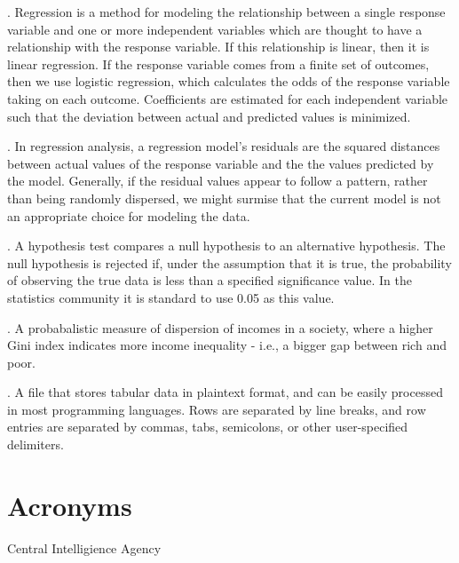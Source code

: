 \documentclass[oneside,12pt]{report}
\begin{document}
\vspace{8pt} . Regression is a method for modeling the relationship between a single response variable and one or more independent variables which are thought to have a relationship with the response variable. If this relationship is linear, then it is linear regression. If the response variable comes from a finite set of outcomes, then we use logistic regression, which calculates the odds of the response variable taking on each outcome. Coefficients are estimated for each independent variable such that the deviation between actual and predicted values is minimized.

\vspace{8pt} . In regression analysis, a regression model's residuals are the squared distances between actual values of the response variable and the the values predicted by the model. Generally, if the residual values appear to follow a pattern, rather than being randomly dispersed, we might surmise that the current model is not an appropriate choice for modeling the data.

\vspace{8pt} . A hypothesis test compares a null hypothesis to an alternative hypothesis. The null hypothesis is rejected if, under the assumption that it is true, the probability of observing the true data is less than a specified significance value. In the statistics community it is standard to use 0.05 as this value.

\vspace{8pt} . A probabalistic measure of dispersion of incomes in a society, where a higher Gini index indicates more income inequality - i.e., a bigger gap between rich and poor.

\vspace{8pt} . A file that stores tabular data in plaintext format, and can be easily processed in most programming languages. Rows are separated by line breaks, and row entries are separated by commas, tabs, semicolons, or other user-specified delimiters.


\chapter{Acronyms}\label{Acronyms}

 Central Intelligience Agency
\vspace{5pt}
\end{document}
